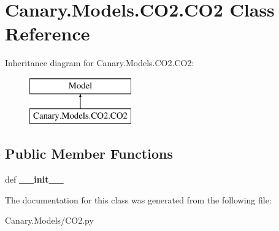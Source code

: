 \hypertarget{class_canary_8_models_1_1_c_o2_1_1_c_o2}{\section{Canary.\-Models.\-C\-O2.\-C\-O2 Class Reference}
\label{class_canary_8_models_1_1_c_o2_1_1_c_o2}
}
Inheritance diagram for Canary.\-Models.\-C\-O2.\-C\-O2\-:\begin{figure}[H]
\begin{center}
\leavevmode
\includegraphics[height=2.000000cm]{class_canary_8_models_1_1_c_o2_1_1_c_o2}
\end{center}
\end{figure}
\subsection*{Public Member Functions}
\begin{DoxyCompactItemize}
\item 
\hypertarget{class_canary_8_models_1_1_c_o2_1_1_c_o2_afb7ebf8ac3af0fff3609e40c781bafbd}{def {\bfseries \-\_\-\-\_\-init\-\_\-\-\_\-}}\label{class_canary_8_models_1_1_c_o2_1_1_c_o2_afb7ebf8ac3af0fff3609e40c781bafbd}

\end{DoxyCompactItemize}


The documentation for this class was generated from the following file\-:\begin{DoxyCompactItemize}
\item 
Canary.\-Models/C\-O2.\-py\end{DoxyCompactItemize}
